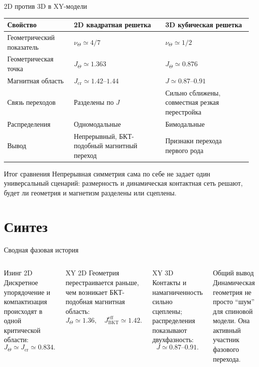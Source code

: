 \documentclass[t,aspectratio=169]{beamer}
\begin{document}
\begin{frame}{2D против 3D в XY-модели}
  \scriptsize
  \begin{tabularx}{\textwidth}{@{}>{\raggedright\arraybackslash}p{}>{\raggedright\arraybackslash}p{}>{\raggedright\arraybackslash}X@{}}
    \toprule
    Свойство & 2D квадратная решетка & 3D кубическая решетка \\
    \midrule
    Геометрический показатель & \(\nu_\Theta\simeq4/7\) & \(\nu_\Theta\simeq1/2\) \\
    Геометрическая точка & \(J_\Theta\simeq1.363\) & \(J_\Theta\simeq0.876\) \\
    Магнитная область & \(J_{\mathrm{cr}}\simeq1.42\)--\(1.44\) & \(J\simeq0.87\)--\(0.91\) \\
    Связь переходов & Разделены по \(J\) & Сильно сближены, совместная резкая перестройка \\
    Распределения & Одномодальные & Бимодальные \\
    Вывод & Непрерывный, БКТ-подобный магнитный переход & Признаки перехода первого рода \\
    \bottomrule
  \end{tabularx}
  \vspace{0.8em}
  \begin{block}{Итог сравнения}
    Непрерывная симметрия сама по себе не задает один универсальный сценарий: размерность и динамическая контактная сеть решают, будет ли геометрия и магнетизм разделены или сцеплены.
  \end{block}
\end{frame}

\section{Синтез}

\begin{frame}{Сводная фазовая история}
  \small
  \begin{columns}[T,onlytextwidth]
    \begin{block}{Изинг 2D}
      Дискретное упорядочение и компактизация происходят в одной критической области:
      \[
        J_\Theta\simeq J_{\mathrm{cr}}\simeq0.834.
      \]
    \end{block}
    \begin{block}{XY 2D}
      Геометрия перестраивается раньше, чем возникает БКТ-подобная магнитная область:
      \[
        J_\Theta\simeq1.36,\quad J_{\mathrm{BKT}}^{\mathrm{eff}}\simeq1.42.
      \]
    \end{block}
    \begin{block}{XY 3D}
      Контакты и намагниченность сильно сцеплены; распределения показывают двухфазность:
      \[
        J\simeq0.87\text{--}0.91.
      \]
    \end{block}
    \begin{block}{Общий вывод}
      Динамическая геометрия не просто ``шум'' для спиновой модели. Она активный участник фазового перехода.
    \end{block}
  \end{columns}
\end{frame}
\end{document}

